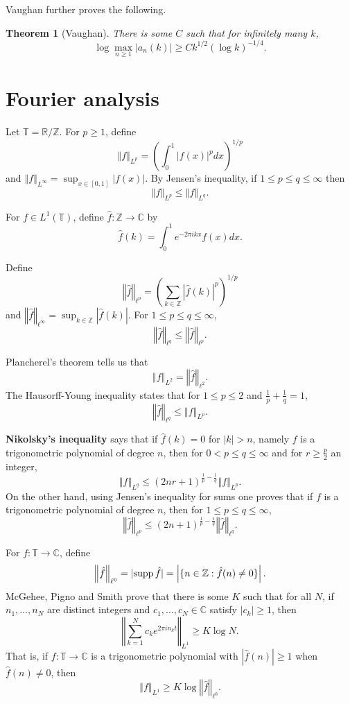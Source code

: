 \documentclass{article}
\newcommand{\supp}{\ensuremath\mathrm{supp}\,}
\newcommand{\norm}[1]{\left\Vert #1 \right\Vert}
\newtheorem{theorem}{Theorem}
\theoremstyle{definition}
\begin{document}
Vaughan further proves the following.

\begin{theorem}[Vaughan]
There is some $C$ such that for infinitely many $k$,
\[
\log \max_{n \geq 1} |a_n(k)| \geq C k^{1/2} (\log k)^{-1/4}.
\]
\end{theorem}






\section{Fourier analysis}
Let $\mathbb{T} = \mathbb{R} / \mathbb{Z}$.
For $p \geq 1$, define
\[
\norm{f}_{L^p} = \left( \int_0^1 |f(x)|^p dx \right)^{1/p}
\]
and $\norm{f}_{L^\infty} = \sup_{x \in [0,1]} |f(x)|$.
By Jensen's inequality,
if $1 \leq p \leq q \leq \infty$ then
\[
\norm{f}_{L^p} \leq \norm{f}_{L^q}.
\]

For $f \in L^1(\mathbb{T})$, define $\widehat{f}:\mathbb{Z} \to \mathbb{C}$ by
\[
\widehat{f}(k) = \int_0^1 e^{-2\pi i kx} f(x) dx.
\]

Define
\[
\norm{\widehat{f}}_{\ell^p} = \left( \sum_{k \in \mathbb{Z}} |\widehat{f}(k)|^p \right)^{1/p}
\]
and $\norm{\widehat{f}}_{\ell^\infty} = \sup_{k \in \mathbb{Z}} |\widehat{f}(k)|$.
For $1 \leq p \leq q \leq \infty$,
\[
\norm{\widehat{f}}_{\ell^q} \leq \norm{\widehat{f}}_{\ell^p}.
\]


Plancherel's theorem  tells us that
\[
\norm{f}_{L^2} = \norm{\widehat{f}}_{\ell^2}.
\]
 The Hausorff-Young inequality states that for $1 \leq p \leq 2$ and $\frac{1}{p}+\frac{1}{q}=1$,
 \[
 \norm{\widehat{f}}_{\ell^q} \leq \norm{f}_{L^p}.
 \]

\textbf{Nikolsky's inequality} \cite[p.~102, Theorem 2.6]{devore} says that if
$\widehat{f}(k) = 0$ for $|k|>n$, namely $f$ is a trigonometric polynomial of degree $n$, then 
for $0<p \leq q \leq \infty$ and for $r \geq \frac{p}{2}$ an integer,
\[
\norm{f}_{L^q} \leq (2nr+1)^{\frac{1}{p}-\frac{1}{q}} \norm{f}_{L^p}.
\]
On the other hand, using Jensen's inequality for sums one proves that if $f$ is a trigonometric polynomial of degree $n$, then for
 $1 \leq p \leq q \leq \infty$, 
 \[
 \norm{\widehat{f}}_{\ell^p} \leq (2n+1)^{\frac{1}{p}-\frac{1}{q}} \norm{\widehat{f}}_{\ell^q}.
 \]

For $f:\mathbb{T} \to \mathbb{C}$, define
\[
\norm{\hat{f}}_{\ell^0} =|\supp \hat{f}| =  \left| \{n \in \mathbb{Z}: \hat{f}(n) \neq 0\} \right|.
\]
McGehee, Pigno and Smith \cite{mcgehee} prove that there is some $K$ such that for all $N$, if
$n_1,\ldots,n_N$ are distinct integers and $c_1,\ldots,c_N \in \mathbb{C}$ satisfy $|c_k| \geq 1$, then
\[
\norm{\sum_{k=1}^N c_k e^{2\pi in_k t}}_{L^1} \geq K \log N.
\]
That is, if $f:\mathbb{T} \to \mathbb{C}$ is a trigonometric polynomial with $|\hat{f}(n)| \geq 1$ when $\hat{f}(n) \neq 0$, then
\[
\norm{f}_{L^1} \geq K \log \norm{\hat{f}}_{\ell^0}.
\]
\end{document}
